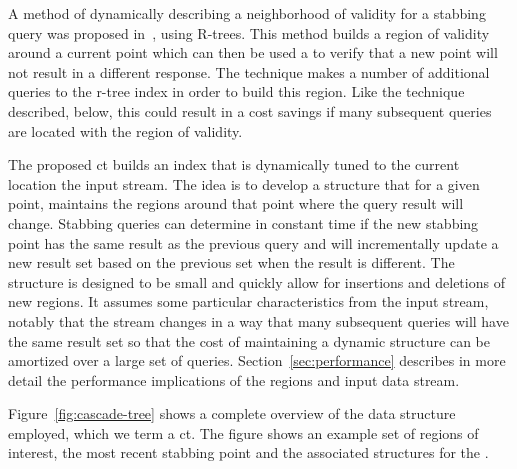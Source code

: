 \documentclass{sig-alternate}
\newcommand{\ct}{\id{DCT}}
\begin{document}
A method of dynamically describing a neighborhood of validity for a
stabbing query was proposed in~\cite{zhang03locationbased}, using
R-trees.  This method builds a region of validity around a current
point which can then be used a to verify that a new point will not
result in a different response.  The technique makes a number of
additional queries to the r-tree index in order to build this region.
Like the technique described, below, this could result in a cost
savings if many subsequent queries are located with the region of
validity.

The proposed \ac{ct} builds an index that is dynamically tuned to the
current location the input stream.  The idea is to develop a structure
that for a given point, maintains the regions around that point where
the query result will change.  Stabbing queries can determine in
constant time if the new stabbing point has the same result as the
previous query and will incrementally update a new result set based on
the previous set when the result is different.  The structure is
designed to be small and quickly allow for insertions and deletions of
new regions.  It assumes some particular characteristics from the
input stream, notably that the stream changes in a way that many
subsequent queries will have the same result set so that the cost of
maintaining a dynamic structure can be amortized over a large set of
queries.  Section~\ref{sec:performance} describes in more detail the
performance implications of the regions and input data stream.

Figure~\ref{fig:cascade-tree} shows a complete overview of the data
structure employed, which we term a \acf{ct}.  The figure shows an
example set of regions of interest, the most recent stabbing point and
the associated structures for the \ct.

\begin{figure*}[htbp]
  \centering
  
  \caption{The Dynamic Cascade Tree, DCT}
  \label{fig:cascade-tree}
\end{figure*}
\end{document}
